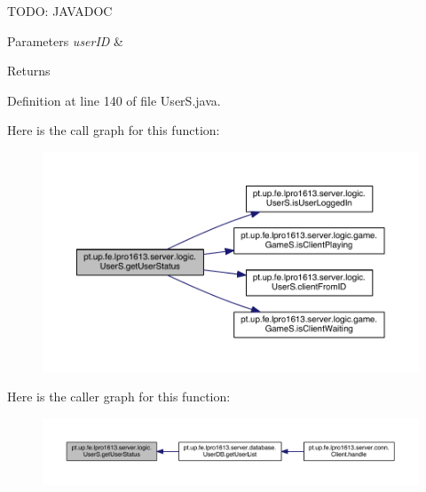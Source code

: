 T\+O\+DO\+: J\+A\+V\+A\+D\+OC 
\begin{DoxyParams}{Parameters}
{\em user\+ID} & \\
\hline
\end{DoxyParams}
\begin{DoxyReturn}{Returns}

\end{DoxyReturn}


Definition at line 140 of file User\+S.\+java.

Here is the call graph for this function\+:
\nopagebreak
\begin{figure}[H]
\begin{center}
\leavevmode
\includegraphics[width=350pt]{classpt_1_1up_1_1fe_1_1lpro1613_1_1server_1_1logic_1_1_user_s_a92958d5006bbce1dbc15722f801d67ef_cgraph}
\end{center}
\end{figure}
Here is the caller graph for this function\+:
\nopagebreak
\begin{figure}[H]
\begin{center}
\leavevmode
\includegraphics[width=350pt]{classpt_1_1up_1_1fe_1_1lpro1613_1_1server_1_1logic_1_1_user_s_a92958d5006bbce1dbc15722f801d67ef_icgraph}
\end{center}
\end{figure}
\hypertarget{classpt_1_1up_1_1fe_1_1lpro1613_1_1server_1_1logic_1_1_user_s_a6ce47ad78e634c757be0ffc905799b4c}{}\label{classpt_1_1up_1_1fe_1_1lpro1613_1_1server_1_1logic_1_1_user_s_a6ce47ad78e634c757be0ffc905799b4c} 

